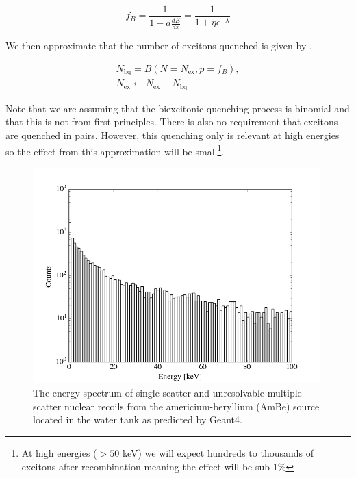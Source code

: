 \begin{equation}
        \label{eqn:birks_quenching}
        f_B = \frac{1}{1 + a \frac{dE}{dx}} = \frac{1}{1 + \eta \epsilon^{- \lambda}}
\end{equation}


We then approximate that the number of excitons quenched is given by .

\begin{equation}
        \label{eqn:xe1t_biexcitonic_quenching}
        \begin{gathered}
                N_{\textrm{bq}} = B(N=N_{\textrm{ex}}, p = f_B), \\
                N_{\textrm{ex}} \leftarrow N_{\textrm{ex}} - N_{\textrm{bq}}
        \end{gathered}
\end{equation}


Note that we are assuming that the biexcitonic quenching process is binomial and that this is not from first principles.  There is also no requirement that excitons are quenched in pairs.  However, this quenching only is relevant at high energies so the effect from this approximation will be small\footnote{At high energies ($> 50$ keV) we will expect hundreds to thousands of excitons after recombination meaning the effect will be sub-1\%}.

\begin{figure}[t]
        \centering
	\includegraphics[width=0.99\textwidth]{xe1t_nr_energy_spec}
	\caption{The energy spectrum of single scatter and unresolvable multiple scatter nuclear recoils from the americium-beryllium (AmBe) source located in the water tank as predicted by Geant4.}
	\label{fig:xe1t_nr_energy_spec}
\end{figure}


